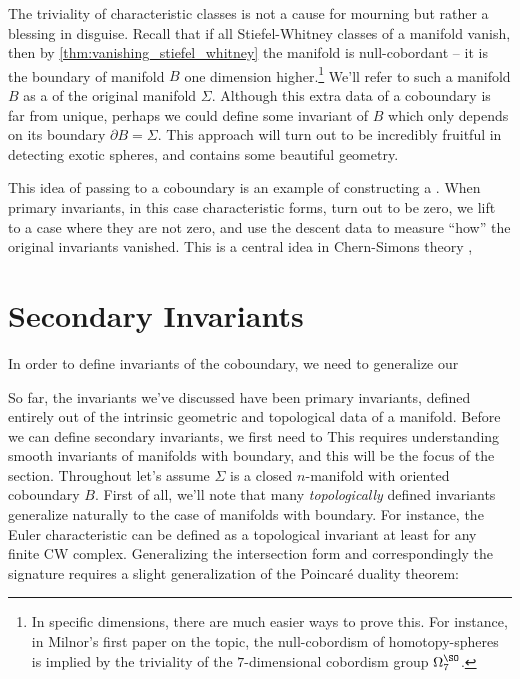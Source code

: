 The triviality of characteristic classes is not a cause for mourning but rather a blessing in disguise. Recall that if all Stiefel-Whitney classes of a manifold vanish, then by \cref{thm:vanishing_stiefel_whitney} the manifold is null-cobordant -- it is the boundary of manifold $B$ one dimension higher.\footnote{In specific dimensions, there are much easier ways to prove this. For instance, in Milnor's first paper \cite{milnor1956manifolds} on the topic, the null-cobordism of homotopy-spheres is implied by the triviality of the $7$-dimensional cobordism group $\Omega^\SO_7$.} We'll refer to such a manifold $B$ as a  of the original manifold $\Sigma$. Although this extra data of a coboundary is far from unique, perhaps we could define some invariant of $B$ which only depends on its boundary $\partial B=\Sigma$. This approach will turn out to be incredibly fruitful in detecting exotic spheres, and contains some beautiful geometry.

\begin{remark}
	This idea of passing to a coboundary is an example of constructing a . When primary invariants, in this case characteristic forms, turn out to be zero, we lift to a case where they are not zero, and use the descent data to measure ``how'' the original invariants vanished. This is a central idea in Chern-Simons theory \cite{chernsimons1974geometricinvariants}, 
\end{remark}


\section{Secondary Invariants}

In order to define invariants of the coboundary, we need to generalize our

So far, the invariants we've discussed have been primary invariants, defined entirely out of the intrinsic geometric and topological data of a manifold. Before we can define secondary invariants, we first need to
This requires understanding smooth invariants of manifolds with boundary, and this will be the focus of the section.
Throughout let's assume $\Sigma$ is a closed $n$-manifold with oriented coboundary $B$.
First of all, we'll note that many \emph{topologically} defined invariants generalize naturally to the case of manifolds with boundary. For instance, the Euler characteristic can be defined as a topological invariant at least for any finite CW complex.
Generalizing the intersection form and correspondingly the signature requires a slight generalization of the Poincar\'e duality theorem:


